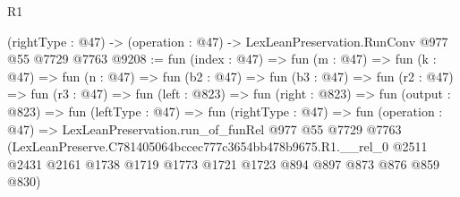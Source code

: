 \begin{lexlean}{R1}
\begin{coremodule}
  (rightType : @47) -> (operation : @47) -> LexLeanPreservation.RunConv @977 @55 @7729 @7763
@9208 := fun (index : @47) =>
  fun (m : @47) =>
  fun (k : @47) =>
  fun (n : @47) =>
  fun (b2 : @47) =>
  fun (b3 : @47) =>
  fun (r2 : @47) =>
  fun (r3 : @47) =>
  fun (left : @823) =>
  fun (right : @823) =>
  fun (output : @823) =>
  fun (leftType : @47) =>
  fun (rightType : @47) =>
  fun (operation : @47) =>
  LexLeanPreservation.run_of_funRel
    @977
    @55
    @7729
    @7763
    (LexLeanPreserve.C781405064bccec777c3654bb478b9675.R1.__rel_0
      @2511
      @2431
      @2161
      @1738
      @1719
      @1773
      @1721
      @1723
      @894
      @897
      @873
      @876
      @859
      @830)
\end{coremodule}
\end{lexlean}
